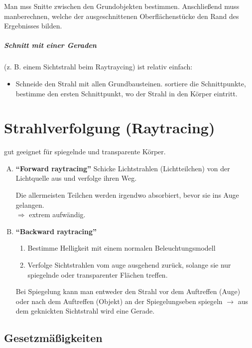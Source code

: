 Man mss Snitte zwischen den Grundobjekten bestimmen. Anschließend muss manberechnen, welche der ausgeschnittenen
Oberflächenstücke den Rand des Ergebnisses bilden.

\paragraph*{Schnitt mit einer Geraden} (z. B. einem Sichtstrahl beim Raytraycing) ist relativ einfach:
\begin{itemize}
 \item Schneide den Strahl mit allen Grundbausteinen.
	sortiere die Schnittpunkte, bestimme den ersten Schnittpunkt, wo der Strahl in den Körper eintritt.
\end{itemize}

\chapter{Strahlverfolgung (Raytracing)}
gut geeignet für spiegelnde und transparente Körper.
\begin{center}
\end{center}
\begin{enumerate}[A)]
 \item \textbf{"`Forward raytracing"'} Schicke Lichtstrahlen (Lichtteilchen) von der Lichtquelle aus und
	verfolge ihren Weg.
	
	Die allermeisten Teilchen werden irgendwo absorbiert, bevor sie ins Auge gelangen.\\
	$\Rightarrow$ extrem aufwändig.
 \item \textbf{"`Backward raytracing"'}
	\begin{enumerate}[1.]
	\item Bestimme Helligkeit mit einem normalen Beleuchtungsmodell
	\item Verfolge Sichtstrahlen vom auge ausgehend zurück, solange sie nur spiegelnde oder transparenter
		Flächen treffen.
	\end{enumerate}
	\begin{center}
	\end{center}
	Bei Spiegelung kann man entweder den Strahl vor dem Auftreffen (Auge) oder nach dem Auftreffen (Objekt)
	an der Spiegelungseben spiegeln $\rightarrow$ aus dem geknickten Sichtstrahl wird eine Gerade.
\end{enumerate}

\section{Gesetzmäßigkeiten}
